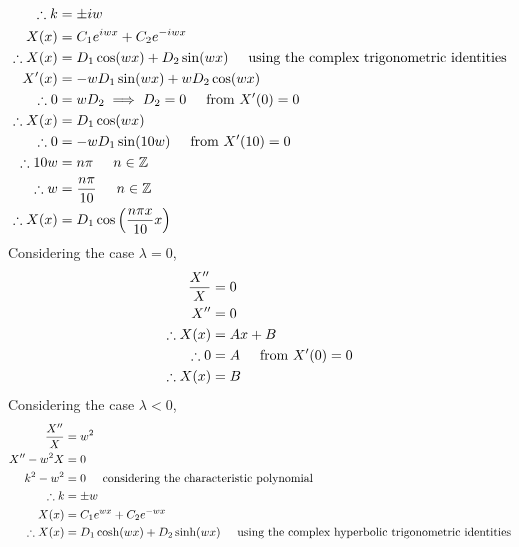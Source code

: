 \documentclass[a4paper]{article}
\newcommand{\ds}{\displaystyle}
\begin{document}
\begin{enumerate}
\begin{enumerate}
\begin{align*}
			\therefore k & = \pm iw\\
			X(x) & = C_1e^{iwx} + C_2e^{-iwx}\\
			\therefore X(x) & = D_1\cos(wx) + D_2\sin(wx) \hspace{5mm} \text{using the complex trigonometric identities}\\
			X^{\prime}(x) & = -wD_1\sin(wx) + wD_2\cos(wx)\\
			\therefore 0 & = wD_2 \implies D_2 = 0 \hspace{5mm} \text{from } X^{\prime}(0) = 0\\
			\therefore X(x) & = D_1\cos(wx)\\
			\therefore 0 & = -wD_1\sin(10w)\hspace{5mm} \text{from } X^{\prime}(10) = 0\\
			\therefore 10w & = n\pi \hspace{5mm} n\in\mathbb{Z}\\
			\therefore w & = \frac{n\pi}{10} \hspace{5mm} n\in\mathbb{Z}\\
			\therefore X(x) & = D_1\cos\left(\frac{n\pi x}{10}x\right)\\
		\end{align*}
		Considering the case $\ds{\lambda = 0}$, 
		\begin{align*}
			\frac{X^{\prime\prime}}{X} & = 0\\
			X^{\prime\prime} & = 0\\
			\therefore X(x) & = Ax+B\\
			\therefore 0 & = A \hspace{5mm} \text{from } X^{\prime}(0) = 0\\
			\therefore X(x) & = B\\
		\end{align*}
		Considering the case $\ds{\lambda < 0}$,
		\begin{align*}
			\frac{X^{\prime\prime}}{X} & = w^2\\
			X^{\prime\prime} - w^2X & = 0\\
			k^2 - w^2 & = 0 \hspace{5mm} \text{considering the characteristic polynomial}\\
			\therefore k & = \pm w\\
			X(x) & = C_1e^{wx} + C_2e^{-wx}\\
			\therefore X(x) & = D_1\cosh(wx) + D_2\sinh(wx) \hspace{5mm} \text{using the complex hyperbolic trigonometric identities}\\

\end{align*}
\end{enumerate}
\end{enumerate}
\end{document}
